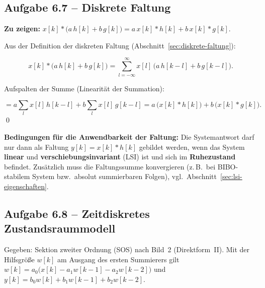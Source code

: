 \subsection*{Aufgabe 6.7 – Diskrete Faltung}

\begin{beweis}

\textbf{Zu zeigen:}
$x[k]*\bigl(a\,h[k]+b\,g[k]\bigr)=a\,x[k]*h[k]+b\,x[k]*g[k]$.

Aus der Definition der diskreten Faltung
(Abschnitt~\ref{sec:diskrete-faltung}):

$$
x[k]*\bigl(a\,h[k]+b\,g[k]\bigr)
 =\sum_{l=-\infty}^{\infty} x[l]\,\bigl(a\,h[k-l]+b\,g[k-l]\bigr).
$$

Aufspalten der Summe (Linearität der Summation):

$$
=a\sum_{l} x[l]\,h[k-l]+b\sum_{l} x[l]\,g[k-l]
 =a\,\bigl(x[k]*h[k]\bigr)+b\,\bigl(x[k]*g[k]\bigr).
$$
\qed

\medskip
\textbf{Bedingungen für die Anwendbarkeit der Faltung:} Die Systemantwort
darf nur dann als Faltung $y[k]=x[k]*h[k]$ gebildet werden, wenn das System
\textbf{linear} und \textbf{verschiebungsinvariant} (LSI) ist und sich im
\textbf{Ruhezustand} befindet. Zusätzlich muss die Faltungssumme
konvergieren (z.\,B.\ bei BIBO-stabilem System bzw.\ absolut summierbaren
Folgen), vgl.\ Abschnitt~\ref{sec:lsi-eigenschaften}.

\end{beweis}

\subsection*{Aufgabe 6.8 – Zeitdiskretes Zustandsraummodell}

Gegeben: Sektion zweiter Ordnung (SOS) nach Bild~2 (Direktform~II).
Mit der Hilfsgröße $w[k]$ am Ausgang des ersten Summierers gilt
$w[k]=a_0\bigl(x[k]-a_1 w[k-1]-a_2 w[k-2]\bigr)$ und
$y[k]=b_0 w[k]+b_1 w[k-1]+b_2 w[k-2]$.

